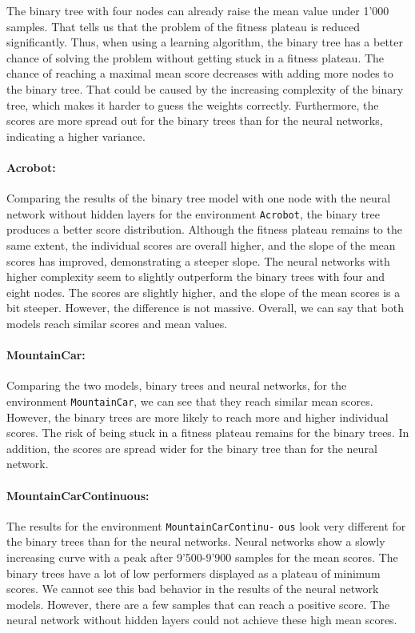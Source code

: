 The binary tree with four nodes can already raise the mean value under 1'000 samples. That tells us that the problem of the fitness plateau is reduced significantly. Thus, when using a learning algorithm, the binary tree has a better chance of solving the problem without getting stuck in a fitness plateau. The chance of reaching a maximal mean score decreases with adding more nodes to the binary tree. That could be caused by the increasing complexity of the binary tree, which makes it harder to guess the weights correctly. Furthermore, the scores are more spread out for the binary trees than for the neural networks, indicating a higher variance.

\paragraph*{Acrobot:} Comparing the results of the binary tree model with one node with the neural network without hidden layers for the environment \verb|Acrobot|, the binary tree produces a better score distribution. Although the fitness plateau remains to the same extent, the individual scores are overall higher, and the slope of the mean scores has improved, demonstrating a steeper slope. The neural networks with higher complexity seem to slightly outperform the binary trees with four and eight nodes. The scores are slightly higher, and the slope of the mean scores is a bit steeper. However, the difference is not massive. Overall, we can say that both models reach similar scores and mean values.

\paragraph*{MountainCar:} Comparing the two models, binary trees and neural networks, for the environment \verb|MountainCar|, we can see that they reach similar mean scores. However, the binary trees are more likely to reach more and higher individual scores. The risk of being stuck in a fitness plateau remains for the binary trees. In addition, the scores are spread wider for the binary tree than for the neural network.

\paragraph*{MountainCarContinuous:} The results for the environment \verb|MountainCarContinu-| \verb|ous| look very different for the binary trees than for the neural networks. Neural networks show a slowly increasing curve with a peak after 9'500-9'900 samples for the mean scores. The binary trees have a lot of low performers displayed as a plateau of minimum scores. We cannot see this bad behavior in the results of the neural network models. However, there are a few samples that can reach a positive score. The neural network without hidden layers could not achieve these high mean scores.

